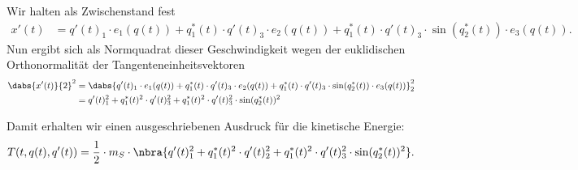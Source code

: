 \documentclass{subfiles}
\begin{document}
    Wir halten als Zwischenstand fest 
    \begin{align*}
        x'(t) &= q'(t)_1\cdot e_1(q(t)) + q_1^*(t)\cdot q'(t)_3\cdot e_2(q(t)) + q_1^*(t)\cdot q'(t)_3\cdot\sin(q_2^*(t))\cdot e_3(q(t)).
    \end{align*}
    Nun ergibt sich als Normquadrat dieser Geschwindigkeit wegen der euklidischen Orthonormalität der Tangenteneinheitsvektoren
    \begin{align*}
        \dabs{x'(t)}{2}^2 &= \dabs{q'(t)_1\cdot e_1(q(t)) + q_1^*(t)\cdot q'(t)_3\cdot e_2(q(t)) + q_1^*(t)\cdot q'(t)_3\cdot\sin(q_2^*(t))\cdot e_3(q(t))}_2^2\\
        &= q'(t)_1^2 +q_1^*(t)^2\cdot q'(t)_3^2 + q_1^*(t)^2\cdot q'(t)_3^2\cdot\sin(q_2^*(t))^2
    \end{align*}
    \begin{ergebnis}
        Damit erhalten wir einen ausgeschriebenen Ausdruck für die kinetische Energie:
        \[
            T(t,q(t),q'(t)) = \frac{1}{2}\cdot m_S\cdot\nbra{q'(t)_1^2 + q_1^*(t)^2\cdot q'(t)_2^2 + q_1^*(t)^2\cdot q'(t)_3^2\cdot\sin(q_2^*(t))^2}.
        \]
    \end{ergebnis}
\end{document}
